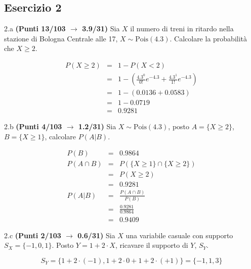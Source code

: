 \documentclass[
  11pt,
]{book}
\theoremstyle{mytheoremstyle}
\theoremstyle{mydefstyle}
\newenvironment{sol}
  {
  \begin{tcolorbox}[enhanced,breakable,arc=0.1mm,boxrule=1pt,colback=white,colframe=iblue,
  title=\bf \fontfamily{lmss}\selectfont \hspace{.5 cm} Soluzione,drop fuzzy shadow]

}{
\end{tcolorbox}
  }
\begin{document}
\subsection{Esercizio 2}\label{esercizio-2-44}

2.a \textbf{(Punti 13/103 \(\rightarrow\) 3.9/31)} Sia \(X\) il numero di treni in ritardo nella stazione di Bologna Centrale alle 17, \(X\sim\text{Pois}(4.3)\). Calcolare la probabilità che \(X\geq 2\).

\begin{sol}
\begin{eqnarray*}
   P( X \geq 2 ) &=& 1-P( X < 2 ) \\                 &=& 1-\left( \frac{ 4.3 ^{ 0 }}{ 0 !}e^{- 4.3 }+\frac{ 4.3 ^{ 1 }}{ 1 !}e^{- 4.3 } \right)\\                 &=& 1-( 0.0136+0.0583 )\\                 &=& 1- 0.0719 \\                 &=&   0.9281 
\end{eqnarray*}

\end{sol}

2.b \textbf{(Punti 4/103 \(\rightarrow\) 1.2/31)} Sia \(X\sim\text{Pois}(4.3)\), posto \(A=\{X\geq 2\}\), \(B=\{X\geq 1\}\), calcolare \(P(A|B)\).

\begin{sol}
\begin{eqnarray}
  P(B) &=&  0.9864\\
  P(A\cap B) &=& P( \{X \geq 1\} \cap \{X \geq 2\})\\
             &=& P(  X \geq 2)\\
             &=& 0.9281\\
  P(A|B)     &=& \frac{P(A\cap B)}{P(B)}\\
             &=& \frac{0.9281}{0.9864}\\
             &=& 0.9409
\end{eqnarray}

\end{sol}

2.c \textbf{(Punti 2/103 \(\rightarrow\) 0.6/31)} Sia \(X\) una variabile casuale con supporto \(S_X=\{-1,0,1\}\). Posto \(Y=1+2\cdot X\),
ricavare il supporto di \(Y\), \(S_Y\).

\begin{sol}
\[
S_Y=\{1+2\cdot (-1),1+2\cdot 0+1+2\cdot (+1)\}=\{-1,1,3\}
\]

\end{sol}
\end{document}
